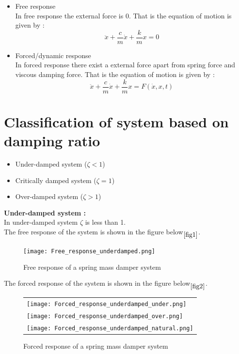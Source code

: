 \documentclass[11pt]{article}
\begin{document}
\begin{itemize}
	\item{Free response}\\
	In free response the external force is 0. That is the equation of 
	motion is given by :
	$$ \ddot{x} + \frac{c}{m}\dot{x} + \frac{k}{m}x = 0 $$

	\item{Forced/dynamic response}\\
	In forced response there exist a external force apart from spring force and 
	viscous damping force. That is the equation of motion is given by :
	$$ \ddot{x} + \frac{c}{m}\dot{x} + \frac{k}{m}x = F(\dot{x},x,t) $$

\end{itemize}


\section{Classification of system based on damping ratio}
\begin{itemize}
	\item{Under-damped system ($\zeta < 1$)}
	\item{Critically damped system ($\zeta = 1$)}
	\item{Over-damped system ($\zeta > 1$)}
\end{itemize}

\newpage
\noindent\textbf{Under-damped system :} \\
In under-damped system $\zeta$ is less than 1. \\
The free response of the system is shown in the figure below$\phantom{}_{\ref{fig1}}$.

\begin{figure}[H]
	\centering
	\centering
	\texttt{[image: Free\_response\_underdamped.png]}
	\caption{Free response of a spring mass damper system}
\end{figure}
\label{fig1}

\newpage
The forced response of the system is shown in the figure below$\phantom{}_{\ref{fig2}}$.
\begin{figure}[H]
	\centering
	\begin{tabular} {l}
	\texttt{[image: Forced\_response\_underdamped\_under.png]} \\
	\texttt{[image: Forced\_response\_underdamped\_over.png]} \\
	\texttt{[image: Forced\_response\_underdamped\_natural.png]} 
	\end{tabular}
	\caption{Forced response of a spring mass damper system}
\end{figure}
\label{fig2}
\end{document}
